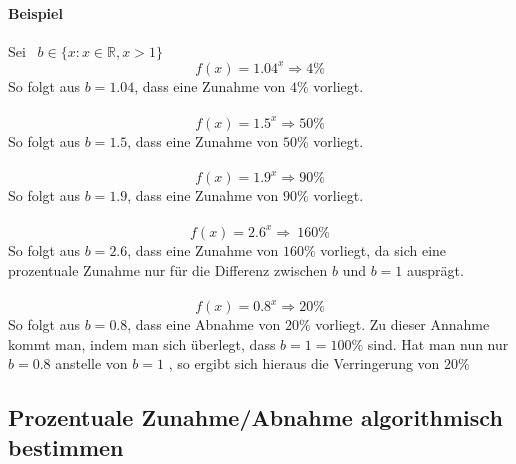 \paragraph{Beispiel} Sei \ $ b \in\{x : x \in \mathbb{R}, x > 1\}$ \
\[f(x)=1.04^x\Rightarrow4\%\]
So folgt aus $b=1.04$, dass eine Zunahme von $4\%$ vorliegt.\\
\\
\[f(x)=1.5^x\Rightarrow50\%\]
So folgt aus $b=1.5$, dass eine Zunahme von $50\%$ vorliegt.\\
\\
\[f(x)=1.9^x\Rightarrow90\%\]
So folgt aus $b=1.9$, dass eine Zunahme von $90\%$ vorliegt.\\
\\
\[f(x)=2.6^x\Rightarrow\ 160\%\]
So folgt aus $b=2.6$, dass eine Zunahme von $160\%$ vorliegt, da sich eine prozentuale Zunahme nur für die Differenz zwischen $b$ und $b=1$ ausprägt.\\
\\
\[f(x)=0.8^x\Rightarrow20\%\]
So folgt aus $b=0.8$, dass eine Abnahme von $20\%$ vorliegt. Zu dieser Annahme kommt man, indem man sich überlegt, dass $b=1=100\%$ sind. Hat man nun nur $b=0.8$ anstelle von $b=1$ , so ergibt sich hieraus die Verringerung von $20\%$
\pagebreak
\subsection{Prozentuale Zunahme/Abnahme algorithmisch bestimmen}







